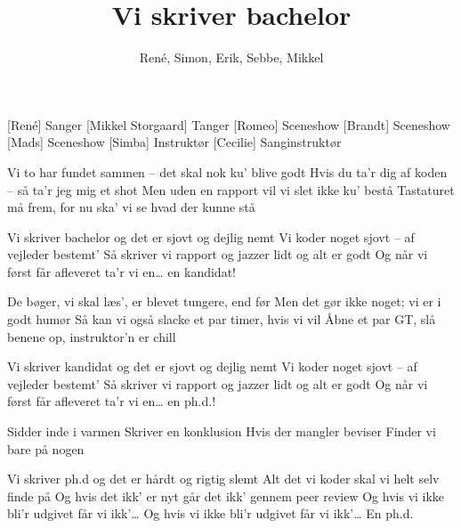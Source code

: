 \documentclass[a4paper,11pt]{article}
\title{Vi skriver bachelor}
\author{René, Simon, Erik, Sebbe, Mikkel}
\begin{document}
\maketitle

\begin{roles}
[René] Sanger
[Mikkel Storgaard] Tanger
[Romeo] Sceneshow
[Brandt] Sceneshow
[Mads] Sceneshow
[Simba] Instruktør
[Cecilie] Sanginstruktør
\end{roles}

\begin{song}

%
Vi to har fundet sammen -- det skal nok ku' blive godt
Hvis du ta'r dig af koden -- så ta'r jeg mig et shot
Men uden en rapport vil vi slet ikke ku' bestå
Tastaturet må frem, for nu ska' vi se hvad der kunne stå

Vi skriver bachelor og det er sjovt og dejlig nemt
Vi koder noget sjovt -- af vejleder bestemt'
Så skriver vi rapport og jazzer lidt og alt er godt
Og når vi først får afleveret ta'r vi en… en kandidat!

De bøger, vi skal læs', er blevet tungere, end før
Men det gør ikke noget; vi er i godt humør
Så kan vi også slacke et par timer, hvis vi vil
Åbne et par GT, slå benene op, instruktor'n er chill

Vi skriver kandidat og det er sjovt og dejlig nemt
Vi koder noget sjovt -- af vejleder bestemt'
Så skriver vi rapport og jazzer lidt og alt er godt
Og når vi først får afleveret ta'r vi en… en ph.d.!

Sidder inde i varmen
Skriver en konklusion
Hvis der mangler beviser
Finder vi bare på nogen

Vi skriver ph.d og det er hårdt og rigtig slemt
Alt det vi koder skal vi helt selv finde på
Og hvis det ikk' er nyt går det ikk' gennem peer review
Og hvis vi ikke bli'r udgivet får vi ikk'\ldots
Og hvis vi ikke bli'r udgivet får vi ikk'\ldots
En ph.d.

\end{song}
\end{document}
